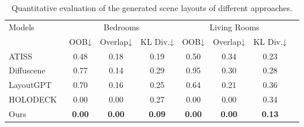 \begin{table*}[]
\setlength{\tabcolsep}{12.5pt}
\begin{tabular}{lccccccccl}
\hline
\multirow{2}{*}{Models} & \multicolumn{4}{c}{Bedrooms}                                                                               & \multicolumn{4}{c}{Living Rooms}                                                                            \\ \cline{2-9} 
                        & {OOB↓} & {Overlap↓} & \multicolumn{2}{c}{KL Div.↓}  & {OOB↓} & {Overlap↓} & \multicolumn{2}{c}{KL Div.↓}   \\ \hline
ATISS~\cite{Paschalidou2021ATISSAT}                   & 0.48                  & 0.18                        & \multicolumn{2}{c}{0.19}          & 0.50                  & 0.34                      & \multicolumn{2}{c}{0.23}           \\ \hline
Diffuscene~\cite{Tang2023DiffuSceneSG}              & 0.77                  & 0.14                        & \multicolumn{2}{c}{0.29}          & 0.95                  & 0.30                      & \multicolumn{2}{c}{0.28}           \\ \hline
LayoutGPT~\cite{Feng2023LayoutGPTCV}               & 0.70                  & 0.16                        & \multicolumn{2}{c}{0.25}          & 0.64                  & 0.21                      & \multicolumn{2}{c}{0.36}           \\ \hline
HOLODECK~\cite{Yang2023HolodeckLG}                & 0.00                  & 0.00                        & \multicolumn{2}{c}{0.27}          & 0.00                  & 0.00                      & \multicolumn{2}{c}{0.34}           \\ \hline
Ours                    & \textbf{0.00}         & \textbf{0.00}              & \multicolumn{2}{c}{\textbf{0.09}}   & \textbf{0.00}                  & \textbf{0.00}                      & \multicolumn{2}{c}{\textbf{0.13}}           \\ \hline
\end{tabular}
\caption{Quantitative evaluation of the generated scene layouts of different approaches.}
\label{tab:comparison}
\end{table*}
